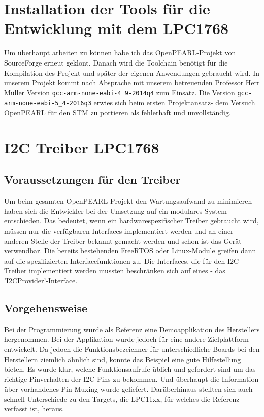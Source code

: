 \section{Installation der Tools für die Entwicklung mit dem LPC1768}
Um überhaupt arbeiten zu können habe ich das OpenPEARL-Projekt von SourceForge erneut geklont. Danach wird die Toolchain benötigt für die Kompilation des Projekt und später der eigenen Anwendungen gebraucht wird. In unserem Projekt kommt nach Absprache mit unserem betreuenden Professor Herr Müller Version \verb+gcc-arm-none-eabi-4_9-2014q4+
 zum Einsatz. 
Die Version \verb+gcc-arm-none-eabi-5_4-2016q3+
 erwies sich beim ersten Projektansatz- dem Versuch OpenPEARL für den STM zu portieren als fehlerhaft und unvollständig.
\section{I2C Treiber LPC1768}
\subsection{Voraussetzungen für den Treiber}
Um beim gesamten OpenPEARL-Projekt den Wartungsaufwand zu minimieren haben sich die Entwickler bei der Umsetzung auf ein modulares System entschieden. Das bedeutet, wenn ein hardwarespezifischer Treiber gebraucht wird, müssen nur die verfügbaren Interfaces implementiert werden und an einer anderen Stelle der Treiber bekannt gemacht werden und schon ist das Gerät verwendbar. Die bereits bestehenden FreeRTOS oder Linux-Module greifen dann auf die spezifizierten Interfacefunktionen zu. 
Die Interfaces, die für den I2C-Treiber implementiert werden mussten beschränken sich auf eines - das 'I2CProvider'-Interface.
\subsection{Vorgehensweise}
Bei der Programmierung wurde als Referenz eine Demoapplikation des Herstellers hergenommen. Bei der Applikation wurde jedoch für eine andere Zielplattform entwickelt. Da jedoch die Funktionsbezeichner für unterschiedliche Boards bei den Herstellern ziemlich ähnlich sind, konnte das Beispiel eine gute Hilfestellung bieten. Es wurde klar, welche Funktionsaufrufe üblich und gefordert sind um das richtige Pinverhalten der I2C-Pins zu bekommen. Und überhaupt die Information über vorhandenes Pin-Muxing wurde geliefert. Darüberhinaus stellten sich auch schnell Unterschiede zu den Targets, die LPC11xx, für welches die Referenz verfasst ist, heraus.
